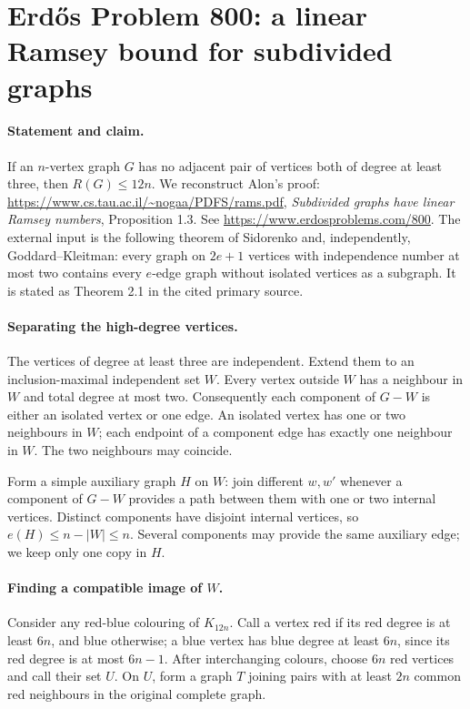 \section*{Erd\H{o}s Problem 800: a linear Ramsey bound for subdivided graphs}

\paragraph{Statement and claim.}
If an \(n\)-vertex graph \(G\) has no adjacent pair of vertices
both of degree at least three, then \(R(G)\leq12n\).
We reconstruct Alon's proof:
\url{https://www.cs.tau.ac.il/~nogaa/PDFS/rams.pdf},
\emph{Subdivided graphs have linear Ramsey numbers},
Proposition 1.3. See \url{https://www.erdosproblems.com/800}.
The external input is the following theorem of
Sidorenko and, independently, Goddard--Kleitman:
every graph on \(2e+1\) vertices with independence number
at most two contains every \(e\)-edge graph without
isolated vertices as a subgraph.
It is stated as Theorem 2.1 in the cited primary source.

\paragraph{Separating the high-degree vertices.}
The vertices of degree at least three are independent.
Extend them to an inclusion-maximal independent set \(W\).
Every vertex outside \(W\) has a neighbour in \(W\) and
total degree at most two. Consequently each component
of \(G-W\) is either an isolated vertex or one edge.
An isolated vertex has one or two neighbours in \(W\);
each endpoint of a component edge has exactly one neighbour
in \(W\). The two neighbours may coincide.

Form a simple auxiliary graph \(H\) on \(W\):
join different \(w,w'\) whenever a component of \(G-W\)
provides a path between them with one or two internal vertices.
Distinct components have disjoint internal vertices,
so \(e(H)\leq n-|W|\leq n\).
Several components may provide the same auxiliary edge;
we keep only one copy in \(H\).

\paragraph{Finding a compatible image of \(W\).}
Consider any red-blue colouring of \(K_{12n}\).
Call a vertex red if its red degree is at least \(6n\),
and blue otherwise; a blue vertex has blue degree at least
\(6n\), since its red degree is at most \(6n-1\).
After interchanging colours, choose \(6n\) red vertices
and call their set \(U\).
On \(U\), form a graph \(T\) joining pairs with at least
\(2n\) common red neighbours in the original complete graph.

